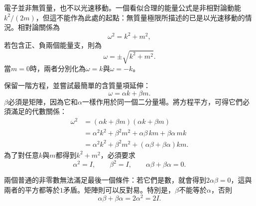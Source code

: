 電子並非無質量，也不以光速移動。一個看似合理的能量公式是非相對論動能\(k^2/(2m)\)，但這不能作為此處的起點：無質量極限所描述的已是以光速移動的情況。相對論關係為
\begin{equation}
\omega^2=k^2+m^2,
\end{equation}
若包含正、負兩個能量支，則為
\begin{equation}
\omega=\pm\sqrt{k^2+m^2}.
\end{equation}
當\(m=0\)時，兩者分別化為\(\omega=k\)與\(\omega=-k\)。

\begin{classroomqa}
\end{classroomqa}

\begin{classroomqa}
\end{classroomqa}

保留一階方程，並嘗試最簡單的含質量項延伸：
\begin{equation}
\omega=\alpha k+\beta m.
\end{equation}
\(\beta\)必須是矩陣，因為它和\(\alpha\)一樣作用於同一個二分量場。將方程平方，可得它們必須滿足的代數關係：
\begin{align}
\omega^2
&=(\alpha k+\beta m)(\alpha k+\beta m)\\
&=\alpha^2k^2+\beta^2m^2
+\alpha\beta\,km+\beta\alpha\,mk\\
&=\alpha^2k^2+\beta^2m^2
+(\alpha\beta+\beta\alpha)km.
\end{align}
為了對任意\(k\)與\(m\)都得到\(k^2+m^2\)，必須要求
\begin{equation}
\alpha^2=I,
\qquad
\beta^2=I,
\qquad
\alpha\beta+\beta\alpha=0.
\end{equation}

兩個普通的非零數無法滿足最後一個條件：若它們是數，就會得到\(2\alpha\beta=0\)，這與兩者的平方都等於\(1\)矛盾。矩陣則可以反對易。特別是，\(\beta\)不能等於\(\alpha\)，否則
\begin{equation}
\alpha\beta+\beta\alpha=2\alpha^2=2I.
\end{equation}

